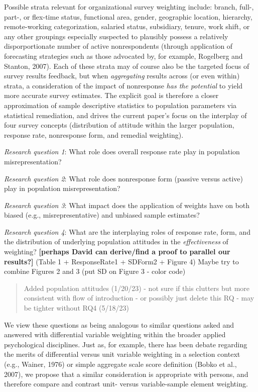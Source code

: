 \documentclass[
  man,mask]{apa7}
\begin{document}
Possible strata relevant for organizational survey weighting include: branch, full-, part-, or flex-time status, functional area, gender, geographic location, hierarchy, remote-working categorization, salaried status, subsidiary, tenure, work shift, or any other groupings especially suspected to plausibly possess a relatively disporportionate number of active nonrespondents (through application of forecasting strategies such as those advocated by, for example, Rogelberg and Stanton, 2007). Each of these strata may of course also be the targeted focus of survey results feedback, but when \emph{aggregating} results across (or even within) strata, a consideration of the impact of nonresponse \emph{has the potential} to yield more accurate survey estimates. The explicit goal is therefore a closer approximation of sample descriptive statistics to population parameters via statistical remediation, and drives the current paper's focus on the interplay of four survey concepts (distribution of attitude within the larger population, response rate, nonresponse form, and remedial weighting).

\emph{Research question 1}: What role does overall response rate play in population misrepresentation?

\emph{Research question 2}: What role does nonresponse form (passive versus active) play in population misrepresentation?

\emph{Research question 3}: What impact does the application of weights have on both biased (e.g., misrepresentative) and unbiased sample estimates?

\emph{Research question 4}: What are the interplaying roles of response rate, form, and the distribution of underlying population attitudes in the \emph{effectiveness} of weighting? \textbf{{[}perhaps David can derive/find a proof to parallel our results?{]}} (Table 1 + ResponseRate1 + SDForm2 + Figure 4)
Maybe try to combine Figures 2 and 3 (put SD on Figure 3 - color code)

\begin{quote}
Added population attitudes (1/20/23) - not sure if this clutters but more consistent with flow of introduction - or possibly just delete this RQ - may be tighter without RQ4 (5/18/23)
\end{quote}

We view these questions as being analogous to similar questions asked and answered with differential variable weighting within the broader applied psychological disciplines. Just as, for example, there has been debate regarding the merits of differential versus unit variable weighting in a selection context (e.g., Wainer, 1976) or simple aggregate scale score definition (Bobko et al., 2007), we propose that a similar consideration is appropriate with persons, and therefore compare and contrast unit- versus variable-sample element weighting.
\end{document}
